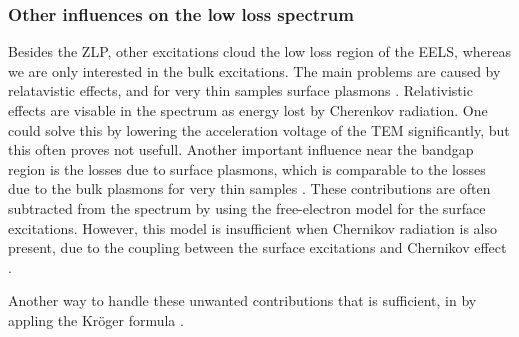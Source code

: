 \subsubsection{Other influences on the low loss spectrum}
Besides the ZLP, other excitations cloud the low loss region of the EELS, whereas we are only interested in the bulk excitations. The main problems are caused by relatavistic effects, and for very thin samples surface plasmons \cite{potapov}. Relativistic effects are visable in the spectrum as energy lost by Cherenkov radiation. One could solve this by lowering the acceleration voltage of the TEM significantly, but this often proves not usefull. Another important influence near the bandgap region is the losses due to surface plasmons, which is comparable to the losses due to the bulk plasmons for very thin samples \cite{potapov}. These contributions are often subtracted from the spectrum by using the free-electron model for the surface excitations. However, this model is insufficient when Chernikov radiation is also present, due to the coupling between the surface excitations and Chernikov effect \cite{potapov}.

Another way to handle these unwanted contributions that is sufficient, in by appling the Kröger formula \cite{potapov,egerton_book}.